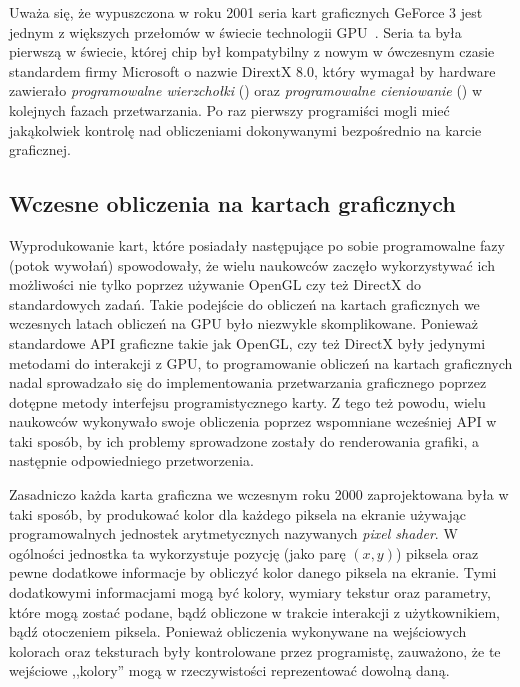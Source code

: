 Uważa się, że wypuszczona w roku 2001 seria kart graficznych GeForce 3 jest jednym z większych przełomów w świecie technologii GPU~\cite{nvidia:geforce3,Cuda:Example}. Seria ta była pierwszą w świecie, której chip był kompatybilny z nowym w ówczesnym czasie standardem firmy Microsoft o nazwie DirextX 8.0, który wymagał by hardware zawierało \emph{programowalne wierzchołki} () oraz \emph{programowalne cieniowanie} () w kolejnych fazach przetwarzania. Po raz pierwszy programiści mogli mieć jakąkolwiek kontrolę nad obliczeniami dokonywanymi bezpośrednio na karcie graficznej.

\subsection{Wczesne obliczenia na kartach graficznych}
\label{sec:wczesne}

Wyprodukowanie kart, które posiadały następujące po sobie programowalne fazy (potok wywołań) spowodowały, że wielu naukowców zaczęło wykorzystywać ich możliwości nie tylko poprzez używanie OpenGL czy też DirectX do standardowych zadań. Takie podejście do obliczeń na kartach graficznych we wczesnych latach obliczeń na GPU było niezwykle skomplikowane. Ponieważ standardowe API graficzne takie jak OpenGL, czy też DirectX były jedynymi metodami do interakcji z GPU, to programowanie obliczeń na kartach graficznych nadal sprowadzało się do implementowania przetwarzania graficznego poprzez dotępne metody interfejsu programistycznego karty. Z tego też powodu, wielu naukowców wykonywało swoje obliczenia poprzez wspomniane wcześniej API w taki sposób, by ich problemy sprowadzone zostały do renderowania grafiki, a następnie odpowiedniego przetworzenia.

Zasadniczo każda karta graficzna we wczesnym roku 2000 zaprojektowana była w taki sposób, by produkować kolor dla każdego piksela na ekranie używając programowalnych jednostek arytmetycznych nazywanych \emph{pixel shader}. W ogólności jednostka ta wykorzystuje pozycję (jako parę $(x, y)$) piksela oraz pewne dodatkowe informacje by obliczyć kolor danego piksela na ekranie. Tymi dodatkowymi informacjami mogą być kolory, wymiary tekstur oraz parametry, które mogą zostać podane, bądź obliczone w trakcie interakcji z użytkownikiem, bądź otoczeniem piksela. Ponieważ obliczenia wykonywane na wejściowych kolorach oraz teksturach były kontrolowane przez programistę, zauważono, że te wejściowe ,,kolory'' mogą w rzeczywistości reprezentować dowolną daną.

